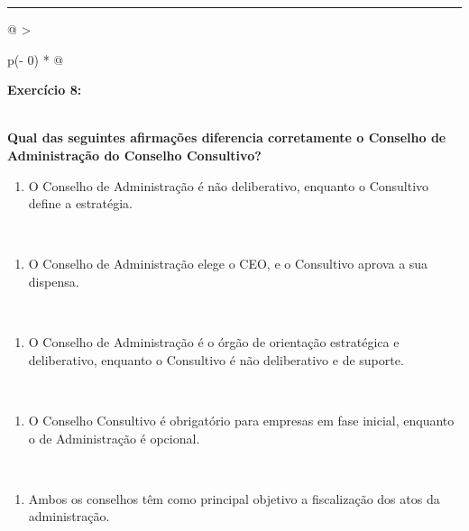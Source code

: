 \documentclass[
]{book}
\providecommand{\tightlist}{%
  \setlength{\itemsep}{0pt}\setlength{\parskip}{0pt}}
\begin{document}
\begin{center}\rule{0.5\linewidth}{0.5pt}\end{center}

\begin{longtable}[]{@{}
  >{\raggedright\arraybackslash}p{(\columnwidth - 0\tabcolsep) * }@{}}
\toprule\noalign{}
\begin{minipage}[b]{\linewidth}\raggedright
\textbf{Exercício 8:}
\end{minipage} \\
\midrule\noalign{}
\endhead
\bottomrule\noalign{}
\endlastfoot
\textbf{Qual das seguintes afirmações diferencia corretamente o Conselho de Administração do Conselho Consultivo?} \\
\begin{minipage}[t]{\linewidth}\raggedright
\begin{enumerate}
\def\labelenumi{\alph{enumi})}
\tightlist
\item
  O Conselho de Administração é não deliberativo, enquanto o Consultivo define a estratégia.
\end{enumerate}
\end{minipage} \\
\begin{minipage}[t]{\linewidth}\raggedright
\begin{enumerate}
\def\labelenumi{\alph{enumi})}
\setcounter{enumi}{1}
\tightlist
\item
  O Conselho de Administração elege o CEO, e o Consultivo aprova a sua dispensa.
\end{enumerate}
\end{minipage} \\
\begin{minipage}[t]{\linewidth}\raggedright
\begin{enumerate}
\def\labelenumi{\alph{enumi})}
\setcounter{enumi}{2}
\tightlist
\item
  O Conselho de Administração é o órgão de orientação estratégica e deliberativo, enquanto o Consultivo é não deliberativo e de suporte.
\end{enumerate}
\end{minipage} \\
\begin{minipage}[t]{\linewidth}\raggedright
\begin{enumerate}
\def\labelenumi{\alph{enumi})}
\setcounter{enumi}{3}
\tightlist
\item
  O Conselho Consultivo é obrigatório para empresas em fase inicial, enquanto o de Administração é opcional.
\end{enumerate}
\end{minipage} \\
\begin{minipage}[t]{\linewidth}\raggedright
\begin{enumerate}
\def\labelenumi{\alph{enumi})}
\setcounter{enumi}{4}
\tightlist
\item
  Ambos os conselhos têm como principal objetivo a fiscalização dos atos da administração.
\end{enumerate}
\end{minipage} \\
\end{longtable}
\end{document}
